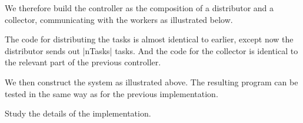 We therefore build the controller as the composition of a distributor and a
collector, communicating with the workers as illustrated below.
%
\begin{center}
\end{center}


The code for distributing the tasks is almost identical to earlier, except now
the distributor sends out |nTasks| tasks.  And the code for the collector is
identical to the relevant part of the previous controller. 

We then construct the system as illustrated above.  The resulting program can
be tested in the same way as for the previous implementation. 

\begin{instruction}
Study the details of the implementation.
\end{instruction}

